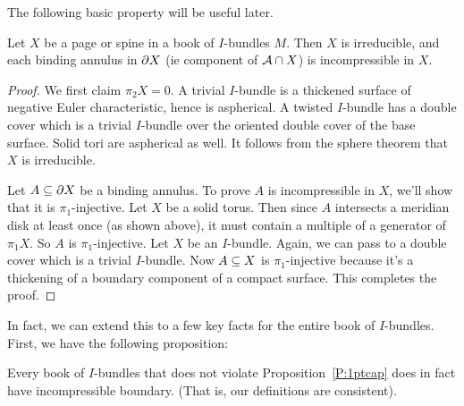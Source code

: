 The following basic property will be useful later.

\begin{prop}\label{P:pagespineII}

Let $X$ be a page or spine in a book of $I$-bundles $M$. Then $X$ is
irreducible, and each binding annulus in $\partial X$ (ie component of $\mathcal{A} \cap X$)
is incompressible in $X$.

\end{prop}

\begin{proof}

We first claim $\pi_2X = 0$. A trivial $I$-bundle is a thickened surface of
negative Euler characteristic, hence is aspherical. A twisted $I$-bundle has
a double cover which is a trivial $I$-bundle over the oriented double cover of
the base surface. Solid tori are aspherical as well. It follows from the sphere
theorem that $X$ is irreducible.

Let $A \subseteq \partial X$ be a binding annulus. To prove $A$ is incompressible in $X$,
we'll show that it is $\pi_1$-injective. Let $X$ be a solid torus. Then since
$A$ intersects a meridian disk at least once (as shown above), it must contain
a multiple of a generator of $\pi_1X$. So $A$ is $\pi_1$-injective. Let $X$ be
an $I$-bundle. Again, we can pass to a double cover which is a trivial
$I$-bundle.  Now $A \subseteq X$ is $\pi_1$-injective because it's a thickening of
a boundary component of a compact surface. This completes the proof.

\end{proof}

In fact, we can extend this to a few key facts for the entire book of
$I$-bundles. First, we have the following proposition:

\begin{prop}\label{P:boibincomp}

Every book of $I$-bundles that does not violate Proposition~\ref{P:1ptcap} does
in fact have incompressible boundary. (That is, our definitions are
consistent).

\end{prop}

